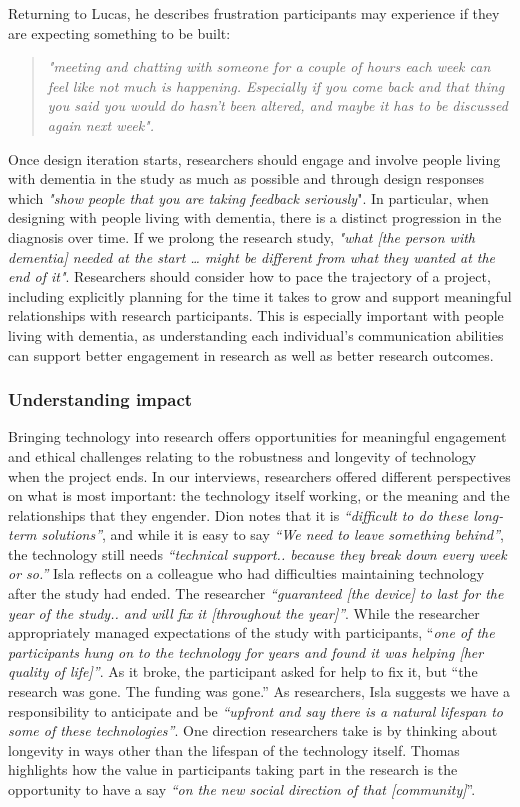 Returning to Lucas, he describes frustration participants may experience if they are expecting something to be built: 

\begin{quote}
\textit{    "meeting and chatting with someone for a couple of hours each week can feel like not much is happening. Especially if you come back and that thing you said you would do hasn't been altered, and maybe it has to be discussed again next week". 
}
\end{quote}

Once design iteration starts, researchers should engage and involve people living with dementia in the study as much as possible and through design responses which \textit{"show people that you are taking feedback seriously}". In particular, when designing with people living with dementia, there is a distinct progression in the diagnosis over time. If we prolong the research study, \textit{"what [the person with dementia] needed at the start … might be different from what they wanted at the end of it"}. Researchers should consider how to pace the trajectory of a project, including explicitly planning for the time it takes to grow and support meaningful relationships with research participants. This is especially important with people living with dementia, as understanding each individual's communication abilities can support better engagement in research as well as better research outcomes.

\subsubsection{Understanding impact}
\label{Ethics:ThemePartTwo:Impact}
Bringing technology into research offers opportunities for meaningful engagement and ethical challenges relating to the robustness and longevity of technology when the project ends. In our interviews, researchers offered different perspectives on what is most important: the technology itself working, or the meaning and the relationships that they engender. Dion notes that it is \textit{“difficult to do these long-term solutions”}, and while it is easy to say \textit{“We need to leave something behind”}, the technology still needs \textit{“technical support.. because they break down every week or so.”} Isla reflects on a colleague who had difficulties maintaining technology after the study had ended. The researcher \textit{“guaranteed [the device] to last for the year of the study.. and will fix it [throughout the year]”}. While the researcher appropriately managed expectations of the study with participants, “\textit{one of the participants hung on to the technology for years and found it was helping [her quality of life]”}. As it broke, the participant asked for help to fix it, but “the research was gone. The funding was gone.” As researchers, Isla suggests we have a responsibility to anticipate and be \textit{“upfront and say there is a natural lifespan to some of these technologies”}. One direction researchers take is by thinking about longevity in ways other than the lifespan of the technology itself. Thomas highlights how the value in participants taking part in the research is the opportunity to have a say\textit{ “on the new social direction of that [community]}”.

